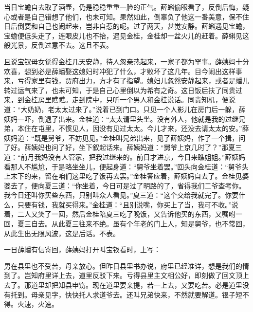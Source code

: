 \begin{parag}
    当日宝蟾自去取了酒壶，仍是稳稳重重一脸的正气。薛蝌偷眼看了，反倒后悔，疑心或者是自己错想了他们，也未可知。果然如此，倒辜负了他这一番美意，保不住日后倒要和自己也闹起来，岂非自惹的呢。过了两天，甚觉安静。薛蝌遇见宝蟾，宝蟾便低头走了，连眼皮儿也不抬，遇见金桂，金桂却一盆火儿的赶着。薛蝌见这般光景，反倒过意不去。这且不表。
\end{parag}


\begin{parag}
    且说宝钗母女觉得金桂几天安静，待人忽亲热起来，一家子都为罕事。薛姨妈十分欢喜，想到必是薛蟠娶这媳妇时冲犯了什么，才败坏了这几年。目今闹出这样事来，亏得家里有钱，贾府出力，方才有了指望。媳妇儿忽然安静起来，或者是蟠儿转过运气来了，也未可知，于是自己心里倒以为希有之奇。这日饭后扶了同贵过来，到金桂房里瞧瞧。走到院中，只听一个男人和金桂说话。同贵知机，便说道：“大奶奶，老太太过来了。”说着已到门口。只见一个人影儿在房门后一躲，薛姨妈一吓，倒退了出来。金桂道：“太太请里头坐。没有外人，他就是我的过继兄弟，本住在屯里，不惯见人，因没有见过太太。今儿才来，还没去请太太的安。”薛姨妈道：“既是舅爷，不妨见见。”金桂叫兄弟出来，见了薛姨妈，作了一个揖，问了好。薛姨妈也问了好，坐下叙起话来。薛姨妈道：“舅爷上京几时了？”那夏三道：“前月我妈没有人管家，把我过继来的。前日才进京，今日来瞧姐姐。”薛姨妈看那人不尴尬，于是略坐坐儿，便起身道：“舅爷坐着罢。”回头向金桂道：“舅爷头上末下的来，留在咱们这里吃了饭再去罢。”金桂答应着，薛姨妈自去了。金桂见婆婆去了，便向夏三道：“你坐着，今日可是过了明路的了，省得我们二爷查考你。我今日还叫你买些东西，只别叫众人看见。”夏三道：“这个交给我就完了。你要什么，只要有钱，我就买得来。”金桂道：“且别说嘴，你买上了当，我可不收。”说着，二人又笑了一回，然后金桂陪夏三吃了晚饭，又告诉他买的东西，又嘱咐一回，夏三自去。从此夏三往来不绝。虽有个年老的门上人，知是舅爷，也不常回，从此生出无限风波，这是后话。不表。
\end{parag}


\begin{parag}
    一日薛蟠有信寄回，薛姨妈打开叫宝钗看时，上写：
\end{parag}


\begin{qute2sp}
    男在县里也不受苦，母亲放心。但昨日县里书办说，府里已经准详，想是我们的情到了。岂知府里详上去，道里反驳下来。亏得县里主文相公好，即刻做了回文顶上去了。那道里却把知县申饬。现在道里要亲提，若一上去，又要吃苦。必是道里没有托到。母亲见字，快快托人求道爷去。还叫兄弟快来，不然就要解道。银子短不得。火速，火速。
\end{qute2sp}


